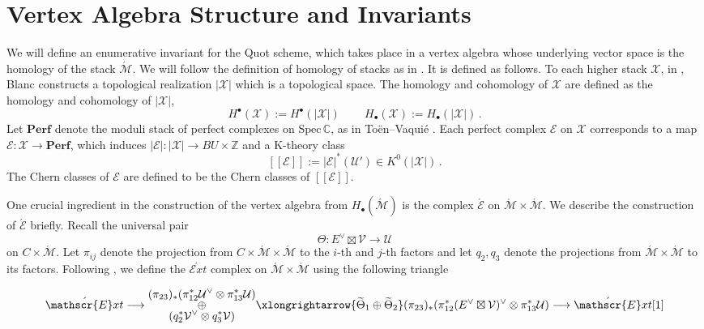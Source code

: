 \documentclass[11pt]{amsart}
\theoremstyle{remark}
\newcommand{\C}{\mathbb{C}}
\newcommand{\mb}[1]{\mathbb{#1}}
\newcommand{\mc}[1]{\mathcal{#1}}
\newcommand{\Mdash}{\acute{\mathcal{M}}}
\newcommand{\spec}{\text{Spec}}
\newcommand{\U}{\mathcal{U}}
\newcommand{\V}{\mathcal{V}}
\newcommand{\wt}[1]{\widetilde{#1}}
\newcommand{\EXT}[0]{\mathscr{E}xt}
\newcommand{\perf}[0]{\textbf{Perf}}
\numberwithin{theorem}{section}
\begin{document}
    \section{Vertex Algebra Structure and Invariants}\label{section Vertex Algebra Structure and Invariants}
    We will define an enumerative invariant for the Quot scheme, 
    which takes place in a vertex algebra whose underlying vector 
    space is the homology of the stack $\Mdash$.
    We will follow the definition of homology of stacks 
    as in \cite[Definition 2.2]{Joy21}.
    It is defined as follows.
    To each higher stack $\mc X$, in \cite{Bla16}, 
    Blanc constructs a topological realization $|\mc X|$ which is a topological space. 
    The homology and cohomology of $\mc X$ are defined as the homology and cohomology of $|\mc X|$,
    $$ H^\bullet(\mc X):= H^\bullet(|\mc X|)\, \quad \quad 
    H_\bullet(\mc X) := H_\bullet(|\mc X|)\,.$$
    Let $\perf$ denote the moduli stack of perfect complexes on $\spec\,\C$, as in To\"en–Vaqui\'e \cite[Definition 3.28]{TV07}.
    Each perfect complex $\mc E$ on $\mc X$ corresponds to a map $\mc E: \mc X \to \perf$,
    which induces $|\mc E|: |\mc X| \to BU \times \mb Z$ and a K-theory class 
    $$ [[\mc E]] := |\mc E|^* (\U') \in K^0(|\mc X|)\,.$$
    The Chern classes of $\mc E$ are defined to be the Chern classes of $[[\mc E]]$.

    One crucial ingredient in the construction of the vertex algebra from $H_\bullet(\Mdash)$ is the complex $\acute{\mc E}$ on $\Mdash \times \Mdash$.
    We describe the construction of $\acute{\mc E}$ briefly.
    Recall the universal pair 
    $$\Theta: E^\vee \boxtimes \V \to \U$$ on $C \times \Mdash$.
    Let $\pi_{ij}$ denote the projection from 
    $C \times \Mdash \times \Mdash$ to the $i$-th and $j$-th factors
    and let $q_2,q_3$ denote the projections from $\Mdash \times \Mdash$ to its factors. 
    Following \cite[Definition 8.14]{Joy21}, we define 
    the $\acute{\EXT}$ complex on $\Mdash \times \Mdash$ 
    using the following triangle
    
    \begin{align}\label{equation definition of ext complex}
    \acute{\EXT} \longrightarrow 
    \substack{
    \displaystyle (\pi_{23})_*(\pi_{12}^*\U^\vee \otimes \pi_{13}^*\U)\\
    \displaystyle 
    \oplus \\ 
    \displaystyle (q_2^*\V^\vee \otimes q_3^*\V)}
    \xlongrightarrow{\wt \Theta_1 \oplus \wt \Theta_2}
    (\pi_{23})_*(\pi_{12}^*(E^\vee \boxtimes \V)^\vee \otimes \pi_{13}^*\U)
    \longrightarrow \acute\EXT[1]
    \end{align}
    \\
    
\end{document}
